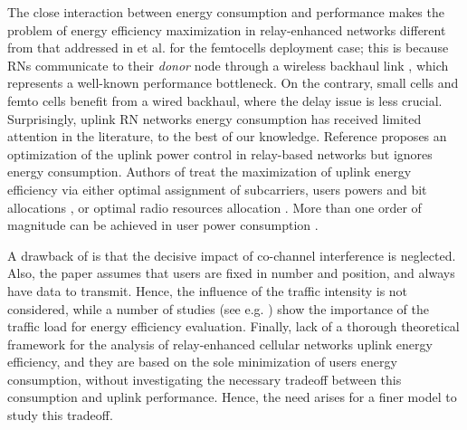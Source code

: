 \documentclass[draftcls,onecolumn]{IEEEtran}
\theoremstyle{plain}
\theoremstyle{definition}
\begin{document}
The close interaction between energy consumption and performance \cite{son} makes the problem of energy efficiency maximization in relay-enhanced networks different from that addressed in \cite{Zhao,Chen} et al. for the femtocells deployment case; this is because RNs communicate to their {\it donor} node through a wireless backhaul link \cite{3gpprelayperf}, which represents a well-known performance bottleneck. On the contrary, small cells and femto cells benefit from a wired backhaul, where the delay issue is less crucial.      
Surprisingly, uplink RN networks energy consumption has received limited attention in the literature, to the best of our knowledge. 
Reference \cite{bulakci13} proposes an optimization of the uplink power control in relay-based networks but ignores energy consumption. Authors of \cite{res_opt, Liang11} treat the maximization of uplink energy efficiency via either optimal assignment of subcarriers, users powers and bit allocations \cite{res_opt}, or optimal radio resources allocation \cite{Liang11}. More than one order of magnitude can be achieved in user power consumption \cite{Liang11}.

A drawback of \cite{res_opt} is that the decisive impact of co-channel interference is neglected. Also, the paper assumes that users are fixed in number and position, and always have data to transmit. Hence, the influence of the traffic intensity is not considered, while a number of studies (see e.g. \cite{nagaraj,son}) show the importance of the traffic load for energy efficiency evaluation. 
Finally, \cite{res_opt,Liang11} lack of a thorough theoretical framework for the analysis of relay-enhanced cellular networks uplink energy efficiency, 
and they are based on the sole minimization of users energy consumption, without investigating the necessary tradeoff between this consumption and uplink performance. Hence, the need arises for a finer model to study this tradeoff. 
\end{document}
